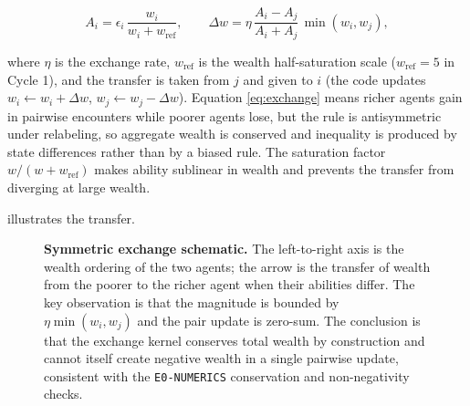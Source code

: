 \documentclass[11pt,a4paper]{article}
\newcommand{\code}[1]{\texttt{#1}}
\begin{document}
\begin{equation}
A_i = \epsilon_i\,\frac{w_i}{w_i+w_{\mathrm{ref}}},\qquad
\Delta w = \eta\,\frac{A_i-A_j}{A_i+A_j}\,\min(w_i,w_j),
\label{eq:exchange}
\end{equation}

where $\eta$ is the exchange rate, $w_{\mathrm{ref}}$ is the wealth
half-saturation scale ($w_{\mathrm{ref}}=5$ in Cycle 1), and the transfer is
taken from $j$ and given to $i$ (the code updates $w_i \leftarrow w_i+\Delta w$,
$w_j \leftarrow w_j-\Delta w$). Equation \eqref{eq:exchange} means richer
agents gain in pairwise encounters while poorer agents lose, but the rule is
antisymmetric under relabeling, so aggregate wealth is conserved and inequality
is produced by state differences rather than by a biased rule. The
saturation factor $w/(w+w_{\mathrm{ref}})$ makes ability sublinear in wealth and
prevents the transfer from diverging at large wealth.

 illustrates the transfer.

\begin{figure}[htbp]
\centering
{}
\caption{\textbf{Symmetric exchange schematic.} The left-to-right axis is the
wealth ordering of the two agents; the arrow is the transfer of wealth from the
poorer to the richer agent when their abilities differ. The key observation is
that the magnitude is bounded by $\eta\min(w_i,w_j)$ and the pair update is
zero-sum. The conclusion is that the exchange kernel conserves total wealth by
construction and cannot itself create negative wealth in a single pairwise
update, consistent with the \code{E0-NUMERICS} conservation and non-negativity
checks.}
\label{fig:schematic-exchange}
\end{figure}
\end{document}
